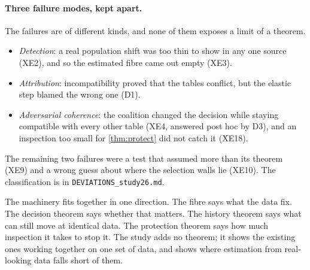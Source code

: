 \documentclass[11pt]{article}
\theoremstyle{definition}\newtheorem{definition}[theorem]{Definition}\newtheorem{remark}[theorem]{Remark}\newtheorem{example}[theorem]{Example}\newtheorem{problem}[theorem]{Open problem}\crefname{problem}{Problem}{Problems}
\begin{document}
\paragraph{Three failure modes, kept apart.} The failures are of different kinds, and none of them exposes a limit of a theorem.
\begin{itemize}
\item \emph{Detection}: a real population shift was too thin to show in any one source (XE2), and so the estimated fibre came out empty (XE3).
\item \emph{Attribution}: incompatibility proved that the tables conflict, but the elastic step blamed the wrong one (D1).
\item \emph{Adversarial coherence}: the coalition changed the decision while staying compatible with every other table (XE4, answered post hoc by D3), and an inspection too small for \cref{thm:protect} did not catch it (XE18).
\end{itemize}
The remaining two failures were a test that assumed more than its theorem (XE9) and a wrong guess about where the selection walls lie (XE10). The classification is in \texttt{DEVIATIONS\_study26.md}.

The machinery fits together in one direction. The fibre says what the data fix. The decision theorem says whether that matters. The history theorem says what can still move at identical data. The protection theorem says how much inspection it takes to stop it. The study adds no theorem; it shows the existing ones working together on one set of data, and shows where estimation from real-looking data falls short of them.
\end{document}
